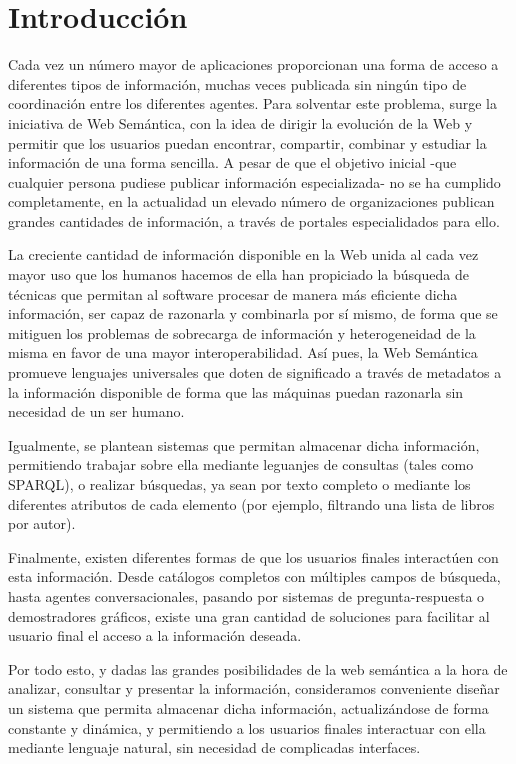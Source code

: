 \documentclass[a4paper,11pt]{report}
\begin{document}
\chapter*{Introducción}

Cada vez un número mayor de aplicaciones proporcionan una forma de acceso a diferentes tipos de información, muchas veces publicada sin ningún tipo de coordinación entre los diferentes agentes. Para solventar este problema, surge la iniciativa de Web Semántica, con la idea de dirigir la evolución de la Web y permitir que los usuarios puedan encontrar, compartir, combinar y estudiar la información de una forma sencilla. A pesar de que el objetivo inicial -que cualquier persona pudiese publicar información especializada- no se ha cumplido completamente, en la actualidad un elevado número de organizaciones publican grandes cantidades de información, a través de portales especialidados para ello.

La creciente cantidad de información disponible en la Web unida al cada vez mayor uso que los humanos hacemos de ella han propiciado la búsqueda de técnicas que permitan al software procesar de manera más eficiente dicha información, ser capaz de razonarla y combinarla por sí mismo, de forma que se mitiguen los problemas de sobrecarga de información y heterogeneidad de la misma en favor de una mayor interoperabilidad. Así pues, la Web Semántica promueve lenguajes universales que doten de significado a través de metadatos a la información disponible de forma que las máquinas puedan razonarla sin necesidad de un ser humano.

Igualmente, se plantean sistemas que permitan almacenar dicha información, permitiendo trabajar sobre ella mediante leguanjes de consultas (tales como SPARQL), o realizar búsquedas, ya sean por texto completo o mediante los diferentes atributos de cada elemento (por ejemplo, filtrando una lista de libros por autor).

Finalmente, existen diferentes formas de que los usuarios finales interactúen con esta información. Desde catálogos completos con múltiples campos de búsqueda, hasta agentes conversacionales, pasando por sistemas de pregunta-respuesta o demostradores gráficos, existe una gran cantidad de soluciones para facilitar al usuario final el acceso a la información deseada.

Por todo esto, y dadas las grandes posibilidades de la web semántica a la hora de analizar, consultar y presentar la información, consideramos conveniente diseñar un sistema que permita almacenar dicha información, actualizándose de forma constante y dinámica, y permitiendo a los usuarios finales interactuar con ella mediante lenguaje natural, sin necesidad de complicadas interfaces.
\end{document}
